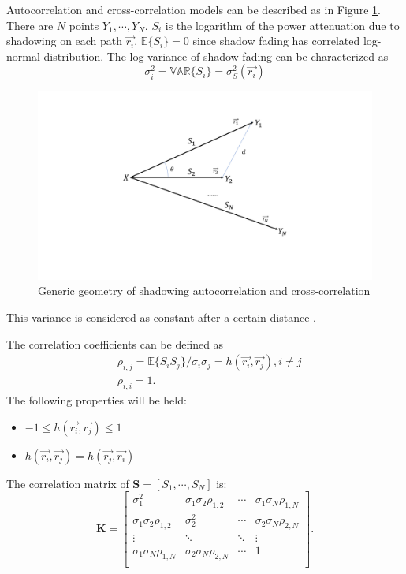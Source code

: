 \par Autocorrelation and cross-correlation models can be described as in Figure \ref{geometry}. There are $N$ points $Y_{1}, \cdots, Y_{N}$.  $S_{i}$ is the logarithm of the power attenuation due to shadowing on each path $\vec{r_{i}}$. $\mathbb{E}\{S_{i}\} = 0$ since shadow fading has correlated log-normal distribution. The log-variance of shadow fading can be characterized as 
\begin{equation}
\sigma_{i}^{2} = \mathbb{VAR}\{S_{i}\} = \sigma_{S}^2(\vec{r_{i}})
\label{sigma}
\end{equation}
\begin{figure} 
\centering
\includegraphics[width=14cm]{FadingGeometry.pdf}
\caption{Generic geometry of shadowing autocorrelation and cross-correlation}
\label{geometry}
\end{figure}
This variance is considered as constant after a certain distance \cite{kitchener2006correlated}.
\par The correlation coefficients can be defined as
\begin{equation}
\begin{split}
& \rho_{i,j} = \mathbb{E}\{S_{i}S_{j}\}/\sigma_{i}\sigma_{j} = h(\vec{r_{i}}, \vec{r_{j}}), i \neq j \\
& \rho_{i,i} = 1.
\end{split}
\end{equation}
The following properties will be held:
\begin{itemize} 
\item $-1\leq h(\vec{r_{i}}, \vec{r_{j}}) \leq 1$
\item $h(\vec{r_{i}}, \vec{r_{j}})  = h(\vec{r_{j}}, \vec{r_{i}}) $
\end{itemize}
The correlation matrix of $\mathbf{S} = [S_{1}, \cdots, S_{N}]$ is:
\begin{equation}
\mathbf{K} = \left[\begin{array}{cccc}
\sigma_{1}^{2} & \sigma_{1}\sigma_{2}\rho_{1,2} & \cdots & \sigma_{1}\sigma_{N}\rho_{1,N}\\
\sigma_{1}\sigma_{2}\rho_{1,2} & \sigma_{2}^{2} & \cdots & \sigma_{2}\sigma_{N}\rho_{2,N}\\
\vdots & \ddots & \ddots & \vdots\\
\sigma_{1}\sigma_{N}\rho_{1,N} & \sigma_{2}\sigma_{N}\rho_{2,N} & \cdots & 1\\
\end{array}\right].
\end{equation}
